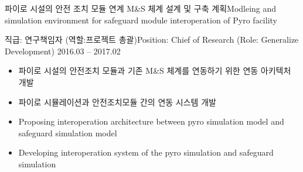\documentclass[english,representative]{resume_structure}
\begin{document}
\begin{Project}
{파이로 시설의 안전 조치 모듈 연계 M\&S 체계 설계 및 구축 계획}{Modleing and simulation environment for safeguard module interoperation of Pyro facility}
{}{} 
{
\ResumeSubSection %
    {직급: 연구책임자 (역할:프로젝트 총괄)}{Position: Chief of Research (Role: Generalize Development)}
    {2016.03 -- 2017.02}
    {
      \begin{itemize}
        \item 파이로 시설의 안전조치 모듈과 기존 M\&S 체계를 연동하기 위한 연동 아키텍처 개발
        \item 파이로 시뮬레이션과 안전조치모듈 간의 연동 시스템 개발
      \end{itemize}
    }
    {
      \begin{itemize}
        \item Proposing interoperation architecture between pyro simulation model and safeguard simulation model
        \item Developing interoperation system of the pyro simulation and safeguard simulation
      \end{itemize}
    }
}
\end{Project}
\end{document}

